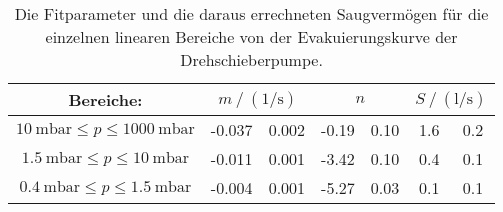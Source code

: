     \begin{table}[H]
      \centering
      \caption{Die Fitparameter und die daraus errechneten Saugvermögen für die einzelnen linearen Bereiche von der Evakuierungskurve der Drehschieberpumpe.}
      \label{tab:fitpara_dreh_alt}
      \begin{tabular}{c S[table-format=2.3] @{${}\pm{}$} S[table-format=1.3]  S[table-format=2.2] @{${}\pm{}$} S[table-format=1.2] S @{${}\pm{}$} S}
        \toprule
        {Bereiche:} &  &  & \\
        \midrule
        $\SI{10}{\milli\bar} \leq p \leq \SI{1000}{\milli\bar}$ & -0.037 & 0.002 & -0.19 & 0.10 & 1.6 & 0.2 \\
        $\SI{1.5}{\milli\bar} \leq p \leq \SI{10}{\milli\bar}$  & -0.011 & 0.001 & -3.42 & 0.10 & 0.4 & 0.1 \\
        $\SI{0.4}{\milli\bar} \leq p \leq \SI{1.5}{\milli\bar}$ & -0.004 & 0.001 & -5.27 & 0.03 & 0.1 & 0.1 \\
        \bottomrule
      \end{tabular}
    \end{table}